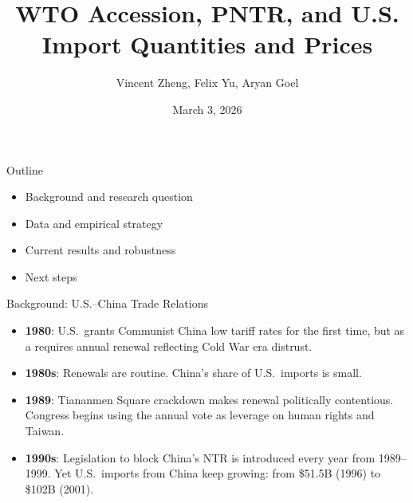 \documentclass[aspectratio=169]{beamer}
\title[WTO/PNTR and U.S. Imports]{WTO Accession, PNTR, and U.S. Import Quantities and Prices}
\subtitle{}
\author{Vincent Zheng, Felix Yu, Aryan Goel}
\date{March 3, 2026}
\begin{document}
\begin{frame}
  \titlepage
\end{frame}


\begin{frame}{Outline}
  \small
  \begin{itemize}
    \item Background and research question
    \item Data and empirical strategy
    \item Current results and robustness
    \item Next steps
  \end{itemize}
\end{frame}


\begin{frame}{Background: U.S.--China Trade Relations}
  \small
  \begin{itemize}
    \item \textbf{1980}: U.S.\ grants Communist China low tariff rates for the first time, but as a requires annual renewal reflecting Cold War era distrust.
    \item \textbf{1980s}: Renewals are routine. China's share of U.S.\ imports is small.
    \item \textbf{1989}: Tiananmen Square crackdown makes renewal politically contentious. Congress begins using the annual vote as leverage on human rights and Taiwan.
    \item \textbf{1990s}: Legislation to block China's NTR is introduced every year from 1989--1999. Yet U.S.\ imports from China keep growing: from \$51.5B (1996) to \$102B (2001).
  \end{itemize}
\end{frame}

\end{document}

